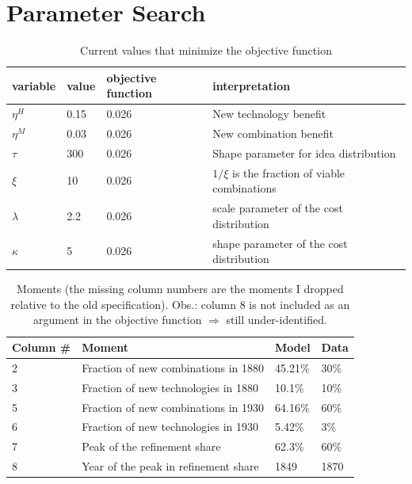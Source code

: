 \documentclass[a4paper,11pt]{article}
\begin{document}
\section*{Parameter Search}

\begin{table}[h!]
\centering
\begin{tabular}{llll}
\hline \hline
variable & value & objective function & interpretation \\ \hline
$\eta^H$ & 0.15 & 0.026 & New technology benefit \\
$\eta^M$ & 0.03 & 0.026 & New combination benefit \\
$\tau$ & 300 & 0.026 & Shape parameter for idea distribution \\
$\xi$ & 10 & 0.026 & $1/\xi$ is the fraction of viable combinations \\
$\lambda $ & 2.2 & 0.026 & scale parameter of the cost distribution \\
$\kappa $ & 5 & 0.026 & shape parameter of the cost distribution \\
\hline \hline
\end{tabular}
\caption{Current values that minimize the objective function}
\end{table}


\begin{table}[h!]
\centering
\begin{tabular}{llll}
\hline \hline
Column \# & Moment & Model & Data \\ \hline
2 & Fraction of new combinations in 1880 & 45.21\% & 30\% \\
3 & Fraction of new technologies in 1880 & 10.1\% & 10\% \\
5 & Fraction of new combinations in 1930 & 64.16\% & 60\% \\
6 & Fraction of new technologies in 1930 & 5.42\% & 3\% \\
7 & Peak of the refinement share & 62.3\% & 60\% \\
8 & Year of the peak in refinement share & 1849 & 1870 \\
\hline \hline
\end{tabular}
\caption{Moments (the missing column numbers are the moments I dropped relative to the old specification). Obs.: column 8 is not included as an argument in the objective function $\Rightarrow$ still under-identified.}
\end{table}
\end{document}
